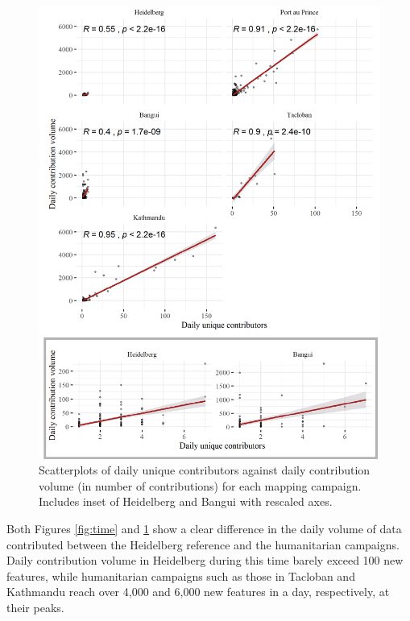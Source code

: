 \begin{figure} %
    \centering %
    \includegraphics[width = \textwidth]{Images/scatter_inset.png} %
    \caption[Scatterplots of daily unique contributors against daily contribution volume.]{Scatterplots of daily unique contributors against daily contribution volume (in number of contributions) for each mapping campaign. Includes inset of Heidelberg and Bangui with rescaled axes.} %
    \label{fig:scatter} %
\end{figure}

Both Figures \ref{fig:time} and \ref{fig:scatter} show a clear difference in the daily volume of data contributed between the Heidelberg reference and the humanitarian campaigns.  Daily contribution volume in Heidelberg during this time barely exceed 100 new features, while humanitarian campaigns such as those in Tacloban and Kathmandu reach over 4,000 and 6,000 new features in a day, respectively, at their peaks. 

